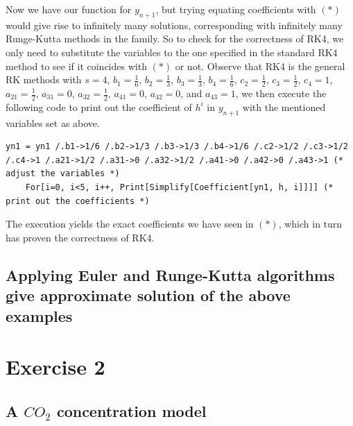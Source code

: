 \documentclass[a4paper]{article}
\begin{document}
Now we have our function for \(y_{n+1}\), but trying equating coefficients with \((*)\) would give rise to infinitely many solutions, corresponding with infinitely many Runge-Kutta methods in the family. So to check for the correctness of RK4, we only need to substitute the variables to the one specified in the standard RK4 method to see if it coincides with \((*)\) or not. Observe that RK4 is the general RK methods with \(s = 4\), \(b_1 = \frac{1}{6}\), \(b_2 = \frac{1}{3}\), \(b_3 = \frac{1}{3}\), \(b_4 = \frac{1}{6}\), \(c_2 = \frac{1}{2}\), \(c_3 = \frac{1}{2}\), \(c_4 = 1\), \(a_{21} = \frac{1}{2}\), \(a_{31} = 0\), \(a_{32} = \frac{1}{2}\), \(a_{41} = 0\), \(a_{42} = 0\), and \(a_{43} = 1\), we then execute the following code to print out the coefficient of \(h^i\) in \(y_{n+1}\) with the mentioned variables set as above.
\begin{mdframed}[hidealllines=true,backgroundcolor=magenta!10]
  \begin{lstlisting}[language=myMMA]
    yn1 = yn1 /.b1->1/6 /.b2->1/3 /.b3->1/3 /.b4->1/6 /.c2->1/2 /.c3->1/2 /.c4->1 /.a21->1/2 /.a31->0 /.a32->1/2 /.a41->0 /.a42->0 /.a43->1 (* adjust the variables *)
    For[i=0, i<5, i++, Print[Simplify[Coefficient[yn1, h, i]]]] (* print out the coefficients *)
  \end{lstlisting}
\end{mdframed}

The execution yields the exact coefficients we have seen in \((*)\), which in turn has proven the correctness of RK4.

\subsection{Applying Euler and Runge-Kutta algorithms give approximate solution of the above examples}


\newpage
\section{Exercise 2}
\subsection{A \(CO_2\) concentration model}
\end{document}
